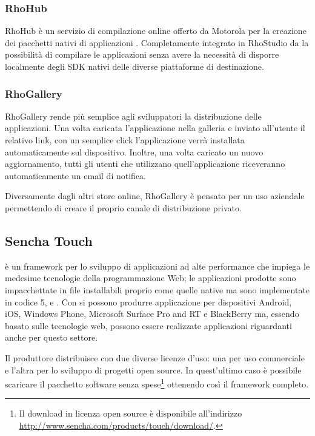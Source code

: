             \subsubsection{RhoHub}
                RhoHub è un servizio di compilazione online offerto da Motorola
                per la creazione dei pacchetti nativi di applicazioni \rhom{}.
                Completamente integrato in RhoStudio da la possibilità di
                compilare le applicazioni senza avere la necessità di disporre
                localmente degli SDK nativi delle diverse piattaforme di
                destinazione.
            \subsubsection{RhoGallery}
                RhoGallery rende più semplice agli sviluppatori la distribuzione
                delle applicazioni. Una volta caricata l'applicazione nella
                galleria e inviato all'utente il relativo link, con un semplice
                click l'applicazione verrà installata automaticamente sul
                dispositivo. Inoltre, una volta caricato un nuovo aggiornamento,
                tutti gli utenti che utilizzano quell'applicazione riceveranno
                automaticamente un email di notifica.

                Diversamente dagli altri store online, RhoGallery è
                pensato per un uso aziendale permettendo di creare il proprio
                canale di distribuzione privato.


        \subsection{Sencha Touch}
            \senchat{} è un frame\-work per lo sviluppo \crossplat{} di
            applicazioni ad alte performance che impiega le medesime tecnologie
            della programmazione Web; le applicazioni prodotte sono
            impacchettate in file installabili proprio come quelle native ma
            sono implementate in codice \html{}5, \css{} e \js{}. Con \senchat{}
            si possono produrre applicazione per dispositivi Android, iOS,
            Windows Phone, Microsoft Surface Pro and RT e BlackBerry ma, essendo
            basato sulle tecnologie web, possono essere realizzate applicazioni
            riguardanti anche per questo settore.

            Il produttore distribuisce \senchat{} con due diverse licenze d'uso:
            una per uso commerciale e l'altra per lo sviluppo di progetti open
            \mbox{source}. In quest'ultimo caso è possibile scaricare il pacchetto
            software senza spese\footnote{Il download in licenza open \mbox{source} è
            disponibile all'indirizzo \url{http://www.sencha.com/products/touch/download/}.}
            ottenendo così il frame\-work completo.

